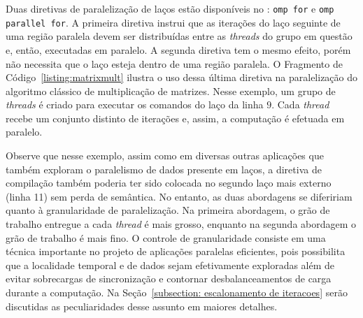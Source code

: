 \documentclass{SBCbookchapter}
\begin{document}
		Duas diretivas de paralelização de laços estão disponíveis no
		\openmp: \texttt{omp for} e \texttt{omp parallel for}. A
		primeira diretiva instrui que as iterações do laço seguinte de
		uma região paralela devem ser distribuídas entre as
		\textit{threads} do grupo em questão e, então, executadas em
		paralelo. A segunda diretiva tem o mesmo efeito, porém não
		necessita que o laço esteja dentro de uma região paralela. O
		Fragmento de Código~\ref{listing:matrixmult} ilustra o uso dessa
		última diretiva na paralelização do algoritmo clássico de
		multiplicação de matrizes. Nesse exemplo, um grupo de
		\textit{threads} é criado para executar os comandos do laço da
		linha $9$. Cada \textit{thread} recebe um conjunto distinto de
		iterações e, assim, a computação é efetuada em paralelo. 

		Observe que nesse exemplo, assim como em diversas outras
		aplicações que também exploram o paralelismo de dados presente
		em laços, a diretiva de compilação também poderia ter sido
		colocada no segundo laço mais externo (linha 11) sem perda de semântica. No
		entanto, as duas abordagens se difeririam quanto à granularidade
		de paralelização. Na primeira abordagem, o grão de trabalho
		entregue a cada \textit{thread} é mais grosso, enquanto na
		segunda abordagem o grão de trabalho é mais fino. O controle de
		granularidade consiste em uma técnica importante no projeto de
		aplicações paralelas eficientes, pois possibilita que a
		localidade temporal e de dados sejam efetivamente exploradas
		além de evitar sobrecargas de sincronização e contornar
		desbalanceamentos de carga durante a computação. Na
		Seção~\ref{subsection: escalonamento de iteracoes} serão
		discutidas as peculiaridades desse assunto em maiores detalhes.
\end{document}
